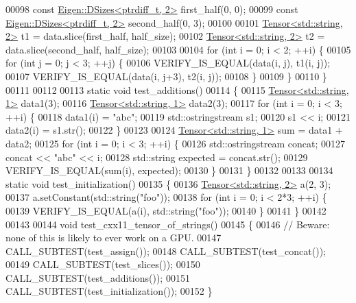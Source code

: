 \begin{DoxyCode}
00098   \textcolor{keyword}{const} \hyperlink{struct_eigen_1_1_d_sizes}{Eigen::DSizes<ptrdiff\_t, 2>} first\_half(0, 0);
00099   \textcolor{keyword}{const} \hyperlink{struct_eigen_1_1_d_sizes}{Eigen::DSizes<ptrdiff\_t, 2>} second\_half(0, 3);
00100 
00101   \hyperlink{class_eigen_1_1_tensor}{Tensor<std::string, 2>} t1 = data.slice(first\_half, half\_size);
00102   \hyperlink{class_eigen_1_1_tensor}{Tensor<std::string, 2>} t2 = data.slice(second\_half, half\_size);
00103 
00104   \textcolor{keywordflow}{for} (\textcolor{keywordtype}{int} i = 0; i < 2; ++i) \{
00105     \textcolor{keywordflow}{for} (\textcolor{keywordtype}{int} j = 0; j < 3; ++j) \{
00106       VERIFY\_IS\_EQUAL(data(i, j),   t1(i, j));
00107       VERIFY\_IS\_EQUAL(data(i, j+3), t2(i, j));
00108     \}
00109   \}
00110 \}
00111 
00112 
00113 \textcolor{keyword}{static} \textcolor{keywordtype}{void} test\_additions()
00114 \{
00115   \hyperlink{class_eigen_1_1_tensor}{Tensor<std::string, 1>} data1(3);
00116   \hyperlink{class_eigen_1_1_tensor}{Tensor<std::string, 1>} data2(3);
00117   \textcolor{keywordflow}{for} (\textcolor{keywordtype}{int} i = 0; i < 3; ++i) \{
00118     data1(i) = \textcolor{stringliteral}{"abc"};
00119     std::ostringstream s1;
00120     s1 << i;
00121     data2(i) = s1.str();
00122   \}
00123 
00124   \hyperlink{class_eigen_1_1_tensor}{Tensor<std::string, 1>} sum = data1 + data2;
00125   \textcolor{keywordflow}{for} (\textcolor{keywordtype}{int} i = 0; i < 3; ++i) \{
00126     std::ostringstream concat;
00127     concat << \textcolor{stringliteral}{"abc"} << i;
00128     std::string expected = concat.str();
00129     VERIFY\_IS\_EQUAL(sum(i), expected);
00130   \}
00131 \}
00132 
00133 
00134 \textcolor{keyword}{static} \textcolor{keywordtype}{void} test\_initialization()
00135 \{
00136   \hyperlink{class_eigen_1_1_tensor}{Tensor<std::string, 2>} a(2, 3);
00137   a.setConstant(std::string(\textcolor{stringliteral}{"foo"}));
00138   \textcolor{keywordflow}{for} (\textcolor{keywordtype}{int} i = 0; i < 2*3; ++i) \{
00139     VERIFY\_IS\_EQUAL(a(i), std::string(\textcolor{stringliteral}{"foo"}));
00140   \}
00141 \}
00142 
00143 
00144 \textcolor{keywordtype}{void} test\_cxx11\_tensor\_of\_strings()
00145 \{
00146   \textcolor{comment}{// Beware: none of this is likely to ever work on a GPU.}
00147   CALL\_SUBTEST(test\_assign());
00148   CALL\_SUBTEST(test\_concat());
00149   CALL\_SUBTEST(test\_slices());
00150   CALL\_SUBTEST(test\_additions());
00151   CALL\_SUBTEST(test\_initialization());
00152 \}
\end{DoxyCode}
